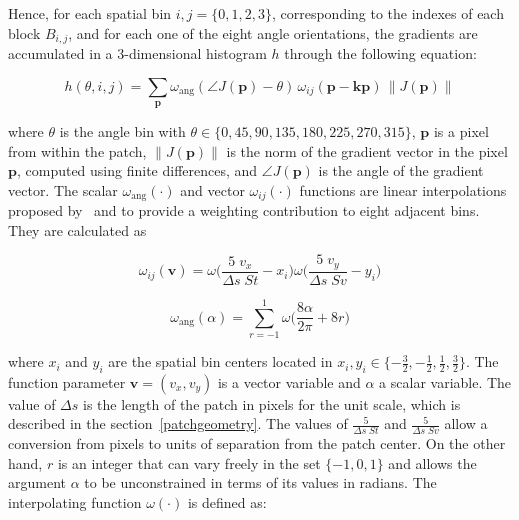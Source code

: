 \documentclass[review]{elsarticle}
\begin{document}
Hence, for each spatial bin $ i,j = \{0,1,2,3\} $, corresponding to the indexes of each block $B_{i,j}$,  and for each one of the eight angle orientations, the gradients are accumulated in a  $3$-dimensional histogram $h$ through the following equation: 
 

\begin{equation}
 h(\theta,i,j) = \sum_{\mathbf{p}} \omega_\mathrm{ang}(\angle J(\mathbf{p}) - \theta)\, \omega_{ij}\left(\mathbf{p} - \mathbf{\mathbf{kp}} \right)\, \left\lVert J(\mathbf{p})\right\rVert 
\label{eq:histogram}
\end{equation}

\noindent  where $\theta$ is the angle bin with $ \theta \in \{0, 45, 90, 135, 180, 225, 270, 315\} $,  $\mathbf{p}$ is a pixel from within the patch,  
$ \left\lVert J(\mathbf{p}) \right\rVert $ is the norm of the gradient vector in the pixel $\mathbf{p}$, computed using finite differences, and $\angle J(\mathbf{p}) $ is the angle of the gradient vector.  The scalar $ \omega_\mathrm{ang}(\cdot) $  and vector $ \omega_{ij}(\cdot) $ functions are linear interpolations proposed by~\cite{Lowe2004} and \cite{Vedaldi2010} to provide a weighting contribution to eight adjacent bins.  They are calculated as  

\begin{equation}
 \omega_{ij}(\mathbf{v}) = \omega \bigg ( \frac{5 \;v_x}{\Delta s \; St} - x_i \bigg ) \omega \bigg ( \frac{5 \; v_y}{\Delta s \; Sv} - y_i \bigg ) 
\label{eq:ij}
\end{equation}

\begin{equation}
 \omega_\mathrm{ang}(\alpha) = \sum_{r=-1}^{1} \omega \bigg ( \frac{8\alpha}{2\pi} + 8r \bigg )
\label{eq:wang}
\end{equation}

\noindent where $x_i$ and $y_i$ are the spatial bin centers located in $ x_i,y_i \in \{-\frac{3}{2},-\frac{1}{2},\frac{1}{2},\frac{3}{2}\} $. The function parameter $\mathbf{v} = ( v_x, v_y ) $ is a vector variable and $\alpha$ a scalar variable.  The value of  $\Delta s$ is the length of the patch in pixels for the unit scale, which is described in the section~\ref{patchgeometry}.  The values of $ \frac{5}{\Delta s \; St} $ and $ \frac{5}{\Delta s \; Sv} $ allow a conversion from pixels to units of separation from the patch center. On the other hand, $r$ is an integer that can vary freely in the set $\{ -1, 0, 1 \} $ and allows the argument $\alpha$ to be unconstrained in terms of its values in radians. The interpolating function $\omega(\cdot)$ is defined as:
\end{document}
